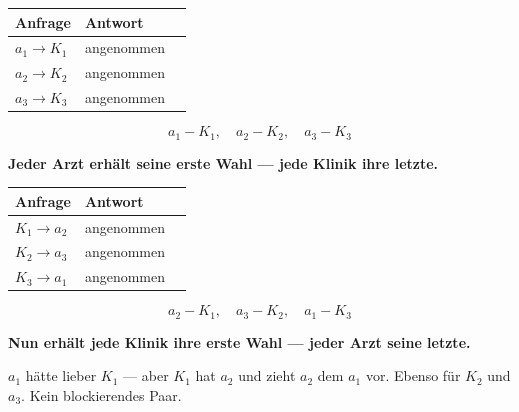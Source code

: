 \begin{merksatz}
\begin{center}
{\small
\renewcommand{\arraystretch}{1.48}
\begin{tabular}{@{}P{2.0cm}P{2.4cm}P{2.6cm}@{}}
\toprule
\textbf{Anfrage} & \textbf{Antwort} & \\
\midrule
$a_1 \to K_1$ & angenommen & \\
$a_2 \to K_2$ & angenommen & \\
$a_3 \to K_3$ & angenommen & \\
\bottomrule
\end{tabular}}
\end{center}

\[ a_1\!-\!K_1, \quad a_2\!-\!K_2, \quad a_3\!-\!K_3 \]

\begin{center}
\begin{minipage}{0.9\textwidth}
\textbf{Jeder Arzt erhält seine erste Wahl --- jede Klinik ihre letzte.}
\end{minipage}
\end{center}

\begin{center}
{\small
\renewcommand{\arraystretch}{1.48}
\begin{tabular}{@{}P{2.0cm}P{2.4cm}P{2.6cm}@{}}
\toprule
\textbf{Anfrage} & \textbf{Antwort} & \\
\midrule
$K_1 \to a_2$ & angenommen & \\
$K_2 \to a_3$ & angenommen & \\
$K_3 \to a_1$ & angenommen & \\
\bottomrule
\end{tabular}}
\end{center}

\[ a_2\!-\!K_1, \quad a_3\!-\!K_2, \quad a_1\!-\!K_3 \]

\begin{center}
\begin{minipage}{0.9\textwidth}
\textbf{Nun erhält jede Klinik ihre erste Wahl --- jeder Arzt seine letzte.}
\end{minipage}
\end{center}

 $a_1$ hätte lieber $K_1$ --- aber $K_1$ hat $a_2$ und zieht $a_2$ dem $a_1$ vor. Ebenso für $K_2$ und $a_3$. Kein blockierendes Paar. \checkmark


\end{merksatz}
